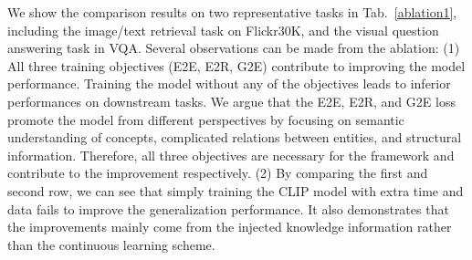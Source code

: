 \begin{table}[t]
    \begin{center}
    \caption{Ablation studies of continuous learning / training objectives. We report results on Flickr30K retrieval task and VQA task with ViT-B/32 as image encoder.}
    \vskip -0.1in
    \label{ablation1}
    \end{center}
\vskip -0.1in
\end{table}

We show the comparison results on two representative tasks in Tab.~\ref{ablation1}, including the image/text retrieval task on Flickr30K, and the visual question answering task in VQA. Several observations can be made from the ablation: (1) All three training objectives (E2E, E2R, G2E) contribute to improving the model performance. Training the model without any of the objectives leads to inferior performances on downstream tasks. We argue that the E2E, E2R, and G2E loss promote the model from different perspectives by focusing on semantic understanding of concepts, complicated relations between entities, and structural information. Therefore, all three objectives are necessary for the framework and contribute to the improvement respectively. (2) By comparing the first and second row, we can see that simply training the CLIP model with extra time and data fails to improve the generalization performance. It also demonstrates that the improvements mainly come from the injected knowledge information rather than the continuous learning scheme.

